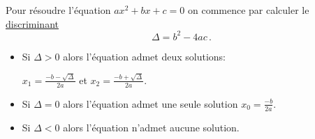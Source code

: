 \begin{frame}

Pour résoudre l'équation $ax^2+bx+c=0$ on commence par calculer le \underline{discriminant} $$\Delta=b^2-4ac \,.$$



\begin{theorem}{}
\begin{itemize}
\item<2-> Si $\Delta>0$ alors l'équation admet deux solutions:

 $x_1=\frac{-b-\sqrt{\Delta}}{2a}$ et $x_2=\frac{-b+\sqrt{\Delta}}{2a}$.

\item<4-> Si $\Delta=0$ alors l'équation admet une seule solution
 $x_0=\frac{-b}{2a}$.

\item<5-> Si $\Delta<0$ alors l'équation n'admet aucune solution.

\end{itemize}
\end{theorem}
	

 \notez
	
	
\end{frame}	






